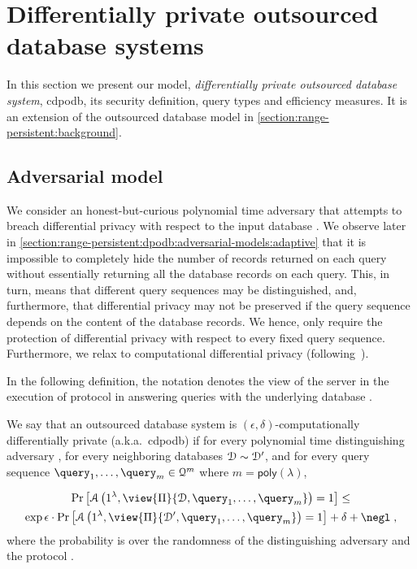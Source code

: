 \section{Differentially private outsourced database systems}\label{section:range-persistent:dpodb}

	In this section we present our model, \emph{differentially private outsourced database system}, \acrshort{cdpodb}, its security definition, query types and efficiency measures.
	It is an extension of the outsourced database model in \cref{section:range-persistent:background}.

	\subsection{Adversarial model}\label{section:range-persistent:dpodb:adversarial-models}

		We consider an honest-but-curious polynomial time adversary that attempts to breach differential privacy with respect to the input database \database{}.
		We observe later in \cref{section:range-persistent:dpodb:adversarial-models:adaptive} that it is impossible to completely hide the number of records returned on each query without essentially returning all the database records on each query.
		This, in turn, means that different query sequences may be distinguished, and, furthermore, that differential privacy may not be preserved if the query sequence depends on the content of the database records.
		We hence, only require the protection of differential privacy with respect to every fixed query sequence.
		Furthermore, we relax to computational differential privacy (following~\cite{computational-dp}).

		In the following definition, the notation  denotes the view of the server \server{} in the execution of protocol \protocol{} in answering queries  with the underlying database \database{}.

		\begin{definition}
			We say that an outsourced database system \protocol{} is $(\epsilon, \delta)$-computationally differentially private (a.k.a.~\acrshort{cdpodb}) if for every polynomial time distinguishing adversary \adversary{}, for every neighboring databases $\mathcal{D} \sim \mathcal{D}^\prime$, and for every query sequence $\fromNtoM{\query}{1}{m} \in \querySet^m$ where $m = \mathsf{poly}(\lambda)$,

			\begin{multline*}
				\probability{\adversary \left( 1^\lambda, \view{\protocol{}}{\database, \fromNtoM{\query}{1}{m}} \right) = 1 } \leq \\
				\exp{\epsilon} \cdot \probability{\adversary \left( 1^\lambda, \view{\protocol{}}{\database^\prime, \fromNtoM{\query}{1}{m}} \right) = 1} + \delta +\negl \; ,
			\end{multline*}
			where the probability is over the randomness of the distinguishing adversary \adversary{} and the protocol \protocol{}.
		\end{definition}

